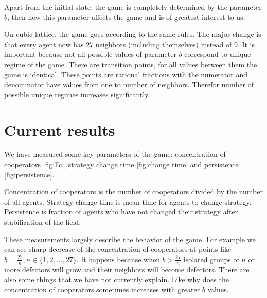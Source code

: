 \documentclass[a4paper]{jpconf}
\begin{document}
Apart from the initial state, the game is completely determined by the parameter $b$, then how this parameter affects the game and is of greatest interest to us.

On cubic lattice, the game goes according to the same rules. The major change is that every agent now has 27 neighbors (including themselves) instead of 9. It is important because not all possible values of parameter $b$ correspond to unique regime of the game. There are transition points, for all values between them the game is identical. These points are rational fractions with the numerator and denominator have values from one to number of neighbors. Therefor number of possible unique regimes increases significantly.

\section{Current results}

We have measured some key parameters of the game: concentration of cooperators \ref{fig:Fc}, strategy change time \ref{fig:change time} and persistence \ref{fig:persistence}.

Concentration of cooperators is the number of cooperators divided by the number of all agents. Strategy change time is mean time for agents to change strategy. Persistence is fraction of agents who have not changed their strategy after stabilization of the field.


These measurements  largely describe the behavior of the game. For example we can see sharp decrease of the concentration of cooperators at points like $b = \frac{27}{n}, n\in\{1, 2, \ldots, 27\} $. It happens because when $b > \frac{27}{n}$ isolated groups of $n$ or more defectors will grow and their neighbors will become defectors. There are also some things that we have not currently explain. Like why does the concentration of cooperators sometimes increases with greater $b$ values. 
\end{document}

